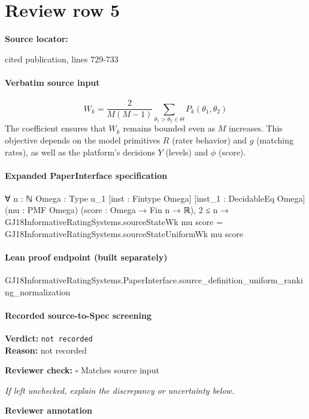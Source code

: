 \documentclass[10pt]{article}
\newcommand{\reviewerbox}{%
  \par\noindent\fbox{\parbox{0.96\linewidth}{\rule{0pt}{0.38in}}}\par
}
\newcommand{\reviewmatch}[1]{%
  \par\noindent\textbf{Reviewer check:} $\square$\; #1\par
  \noindent\emph{If left unchecked, explain the discrepancy or uncertainty below.}\par
}
\begin{document}
\section*{Review row 5}
\textbf{Source locator:} {\footnotesize\raggedright cited publication, lines 729-\allowbreak{}733\par}
\paragraph{Verbatim source input}
\begin{ReviewVerbatim}
\begin{equation}
\label{eq:objective}
W_k = \frac{2}{M(M-1)}\sum_{\theta_1 > \theta_2 \in \Theta} P_k(\theta_1, \theta_2)
\end{equation}
The coefficient ensures that ${W}_k$ remains bounded even as $M$ increases. This objective depends on the model primitives $R$ (rater behavior) and $g$ (matching rates), as well as the platform's decisions $Y$ (levels) and $\phi$ (score).
\end{ReviewVerbatim}


\paragraph{Expanded PaperInterface specification}
\begin{ReviewVerbatim}
∀ {n : ℕ} {Omega : Type u_1} [inst : Fintype Omega] [inst_1 : DecidableEq Omega] (mu : PMF Omega)
  (score : Omega → Fin n → ℝ),
  2 ≤ n →
    GJ18InformativeRatingSystems.sourceStateWk mu score = GJ18InformativeRatingSystems.sourceStateUniformWk mu score
\end{ReviewVerbatim}

\paragraph{Lean proof endpoint (built separately)}\begin{ReviewVerbatim}
GJ18InformativeRatingSystems.PaperInterface.source_definition_uniform_ranking_normalization
\end{ReviewVerbatim}

\paragraph{Recorded source-to-Spec screening}
\textbf{Verdict:} \texttt{not recorded}
\\
\textbf{Reason:} not recorded
\reviewmatch{Matches source input}
\noindent\textbf{Reviewer annotation}\par
\reviewerbox
\clearpage
\hypertarget{source-claim-803ea24378437fda}{}
\end{document}

